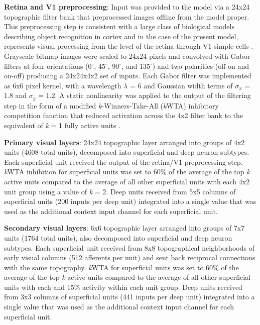 \documentclass[dwyatte_dissertation.tex]{subfiles}
\begin{document}
\textbf{Retina and V1 preprocessing}: Input was provided to the model via a 24x24 topographic filter bank that preprocessed images offline from the model proper. This preprocessing step is consistent with a large class of biological models describing object recognition in cortex \cite[e.g.,]{RiesenhuberPoggio99,SerreOlivaPoggio07,OReillyWyatteHerdEtAl13} and in the case of the present model, represents visual processing from the level of the retina through V1 simple cells \cite{HubelWiesel62}. Grayscale bitmap images were scaled to 24x24 pixels and convolved with Gabor filters at four orientations (0$^\circ$, 45$^\circ$, 90$^\circ$, and 135$^\circ$) and two polarities (off-on and on-off) producing a 24x24x4x2 set of inputs. Each Gabor filter was implemented as 6x6 pixel kernel, with a wavelength $\lambda$ = 6 and Gaussian width terms of $\sigma_x$ = 1.8 and $\sigma_y$ = 1.2. A static nonlinearity was applied to the output of the filtering step in the form of a modified \textit{k}-Winners-Take-All (\textit{k}WTA) inhibitory competition function that reduced activation across the 4x2 filter bank to the equivalent of \textit{k} = 1 fully active units \cite[see][Supporting Information]{OReillyWyatteHerdEtAl13}.

\textbf{Primary visual layers}: 24x24 topographic layer arranged into groups of 4x2 units (4608 total units), decomposed into superficial and deep neuron subtypes. Each superficial unit received the output of the retina/V1 preprocessing step. \textit{k}WTA inhibition for superficial units was set to 60\% of the average of the top \textit{k} active units compared to the average of all other superficial units with each 4x2 unit group using a value of \textit{k} = 2. Deep units received from 5x5 columns of superficial units (200 inputs per deep unit) integrated into a single value that was used as the additional context input channel for each superficial unit.

\textbf{Secondary visual layers}: 6x6 topographic layer arranged into groups of 7x7 units (1764 total units), also decomposed into superficial and deep neuron subtypes. Each superficial unit received from 8x8 topographical neighborhoods of early visual columns (512 afferents per unit) and sent back reciprocal connections with the same topography. \textit{k}WTA for superficial units was set to 60\% of the average of the top \textit{k} active units compared to the average of all other superficial units with each and 15\% activity within each unit group. Deep units received from 3x3 columns of superficial units (441 inputs per deep unit) integrated into a single value that was used as the additional context input channel for each superficial unit.
\end{document}
